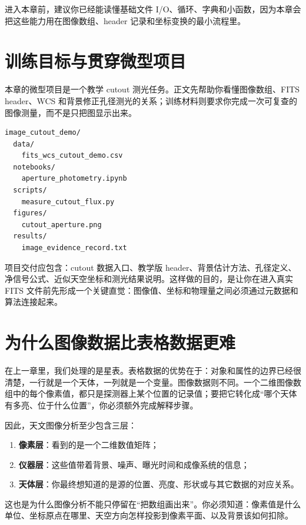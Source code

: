 进入本章前，建议你已经能读懂基础文件 I/O、循环、字典和小函数，因为本章会把这些能力用在图像数组、header 记录和坐标变换的最小流程里。

\section{训练目标与贯穿微型项目}

本章的微型项目是一个教学 cutout 测光任务。正文先帮助你看懂图像数组、FITS header、WCS 和背景修正孔径测光的关系；训练材料则要求你完成一次可复查的图像测量，而不是只把图显示出来。

\begin{examplebox}[最小图像测光项目结构]
\begin{lstlisting}[style=terminal]
image_cutout_demo/
  data/
    fits_wcs_cutout_demo.csv
  notebooks/
    aperture_photometry.ipynb
  scripts/
    measure_cutout_flux.py
  figures/
    cutout_aperture.png
  results/
    image_evidence_record.txt
\end{lstlisting}
\end{examplebox}

项目交付应包含：cutout 数据入口、教学版 header、背景估计方法、孔径定义、净信号公式、近似天空坐标和测光结果说明。这样做的目的，是让你在进入真实 FITS 文件前先形成一个关键直觉：图像值、坐标和物理量之间必须通过元数据和算法连接起来。

\section{为什么图像数据比表格数据更难}

在上一章里，我们处理的是星表。表格数据的优势在于：对象和属性的边界已经很清楚，一行就是一个天体，一列就是一个变量。图像数据则不同。一个二维图像数组中的每个像素值，都只是探测器上某个位置的记录值；要把它转化成“哪个天体有多亮、位于什么位置”，你必须额外完成解释步骤。

因此，天文图像分析至少包含三层：

\begin{enumerate}
    \item \textbf{像素层}：看到的是一个二维数值矩阵；
    \item \textbf{仪器层}：这些值带着背景、噪声、曝光时间和成像系统的信息；
    \item \textbf{天体层}：你最终想知道的是源的位置、亮度、形状或与其它数据的对应关系。
\end{enumerate}

这也是为什么图像分析不能只停留在“把数组画出来”。你必须知道：像素值是什么单位、坐标原点在哪里、天空方向怎样投影到像素平面、以及背景该如何扣除。

